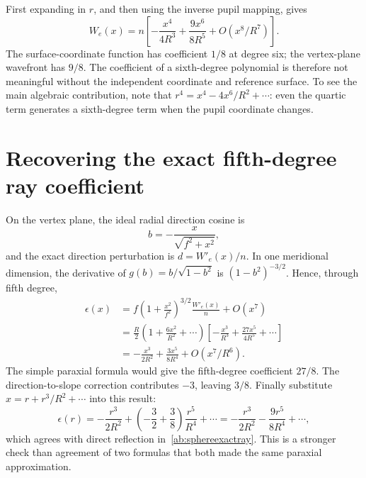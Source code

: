 First expanding in $r$, and then using the inverse pupil mapping, gives
\begin{equation}
 \boxed{W_e(x)=n\left[-\frac{x^4}{4R^3}
                     +\frac{9x^6}{8R^5}+O(x^8/R^7)\right].}
 \label{ab:mirrorplaneW}
\end{equation}
The surface-coordinate function has coefficient $1/8$ at degree six;
the vertex-plane wavefront has $9/8$. The coefficient of a sixth-degree
polynomial is therefore not meaningful without the independent coordinate
and reference surface. To see the main algebraic contribution, note that
$r^4=x^4-4x^6/R^2+\cdots$: even the quartic term generates a sixth-degree
term when the pupil coordinate changes.

\section{Recovering the exact fifth-degree ray coefficient}
On the vertex plane, the ideal radial direction cosine is
\begin{equation}
 b=-\frac{x}{\sqrt{f^2+x^2}},
\end{equation}
and the exact direction perturbation is $d=W'_e(x)/n$.
In one meridional dimension, the derivative of
$g(b)=b/\sqrt{1-b^2}$ is $(1-b^2)^{-3/2}$. Hence, through fifth degree,
\begin{align}
 \epsilon(x)
 &=f\left(1+\frac{x^2}{f^2}\right)^{3/2}\frac{W'_e(x)}n+O(x^7)\\
 &=\frac R2\left(1+\frac{6x^2}{R^2}+\cdots\right)
       \left[-\frac{x^3}{R^3}+\frac{27x^5}{4R^5}+\cdots\right]\\
 &=-\frac{x^3}{2R^2}+\frac{3x^5}{8R^4}+O(x^7/R^6).
 \label{ab:mirrorfifthcheck}
\end{align}
The simple paraxial formula would give the fifth-degree coefficient $27/8$.
The direction-to-slope correction contributes $-3$, leaving $3/8$.
Finally substitute $x=r+r^3/R^2+\cdots$ into this result:
\begin{equation}
 \epsilon(r)=-\frac{r^3}{2R^2}
             +\left(-\frac32+\frac38\right)\frac{r^5}{R^4}
             +\cdots
            =-\frac{r^3}{2R^2}-\frac{9r^5}{8R^4}+\cdots,
\end{equation}
which agrees with direct reflection in~\eqref{ab:sphereexactray}. This is a
stronger check than agreement of two formulas that both made the same
paraxial approximation.

